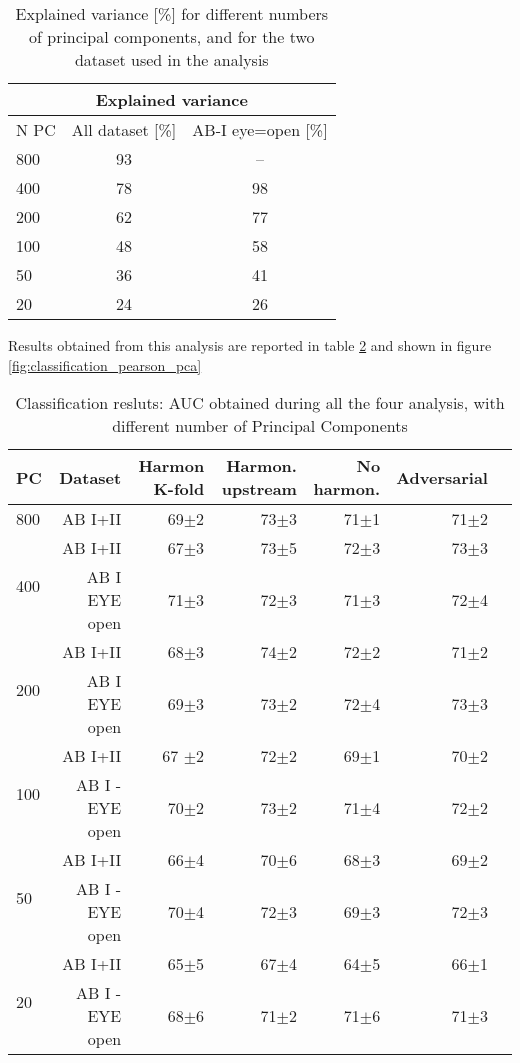 \documentclass[a4paper,11pt]{article}
\begin{document}
\begin{table}
\centering
\begin{tabular}{ |l|c c| }
\hline
\multicolumn{3}{|c|}{Explained variance} \\
 \hline
  N PC & All dataset [\%] & AB-I eye=open [\%] \\
  \hline
 800 & 93 & -- \\
 400 & 78 & 98 \\
 200 & 62 & 77 \\
 100 &48 & 58 \\
 50 & 36 & 41 \\
 20 & 24 & 26\\
 \hline
\end{tabular}
\caption{Explained variance [\%] for different numbers of principal components, and for the two dataset used in the analysis}
\label{tab:pca_explained}
\end{table}



Results obtained from this analysis are reported in table \ref{tab:classification_pearson_pca} and shown in figure \ref{fig:classification_pearson_pca}

\begin{table}[!htp]\centering
\scriptsize
\begin{tabular}{lrrrrrr}\toprule
PC &Dataset &Harmon K-fold &Harmon. upstream &No harmon. &Adversarial \\\midrule
800 &AB I+II &69$\pm$2 &73$\pm$3 &71$\pm$1 &71$\pm$2 \\
\hline
\multirow{2}{*}{400} &AB I+II &67$\pm$3 &73$\pm$5 &72$\pm$3 &73$\pm$3 \\
&AB I EYE open &71$\pm$3 &72$\pm$3 &71$\pm$3 &72$\pm$4 \\
\hline
\multirow{2}{*}{200} &AB I+II &68$\pm$3 &74$\pm$2 &72$\pm$2 &71$\pm$2 \\
&AB I EYE open &69$\pm$3 &73$\pm$2 &72$\pm$4 &73$\pm$3 \\
\hline
\multirow{2}{*}{100} &AB I+II &67 $\pm$2 &72$\pm$2 &69$\pm$1 &70$\pm$2 \\
&AB I - EYE open &70$\pm$2 &73$\pm$2 &71$\pm$4 &72$\pm$2 \\
\hline
\multirow{2}{*}{50} &AB I+II &66$\pm$4 &70$\pm$6 &68$\pm$3 &69$\pm$2 \\
&AB I - EYE open &70$\pm$4 &72$\pm$3 &69$\pm$3 &72$\pm$3 \\
\hline
\multirow{2}{*}{20} &AB I+II &65$\pm$5 &67$\pm$4 &64$\pm$5 &66$\pm$1 \\
&AB I - EYE open &68$\pm$6 &71$\pm$2 &71$\pm$6 &71$\pm$3 \\
\bottomrule
\end{tabular}
\caption{Classification resluts: AUC obtained during all the four analysis, with different number of Principal Components}
\label{tab:classification_pearson_pca}
\end{table}
\end{document}
